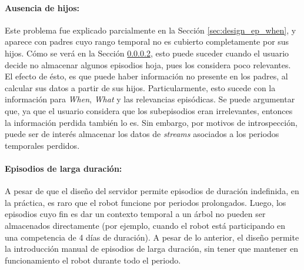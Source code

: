 \paragraph{Ausencia de hijos:} Este problema fue explicado parcialmente en la Sección \ref{sec:design_ep_when}, y aparece con padres cuyo rango temporal no es cubierto completamente por sus hijos. Cómo se verá en la Sección \ref{}, esto puede suceder cuando el usuario decide no almacenar algunos episodios hoja, pues los considera poco relevantes. El efecto de ésto, es que puede haber información no presente en los padres, al calcular sus datos a partir de sus hijos. Particularmente, esto sucede con la información para \textit{When}, \textit{What} y las relevancias episódicas. Se puede argumentar que, ya que el usuario considera que los subepisodios eran irrelevantes, entonces la información perdida también lo es. Sin embargo, por motivos de introspección, puede ser de interés almacenar los datos de \textit{streams} asociados a los periodos temporales perdidos.

\paragraph{Episodios de larga duración:}
A pesar de que el diseño del servidor permite episodios de duración indefinida, en la práctica, es raro que el robot funcione por periodos prolongados. Luego, los episodios cuyo fin es dar un contexto temporal a un árbol no pueden ser almacenados directamente (por ejemplo, cuando el robot está participando en una competencia de 4 días de duración). A pesar de lo anterior, el diseño permite la introducción manual de episodios de larga duración, sin tener que mantener en funcionamiento el robot durante todo el periodo.








